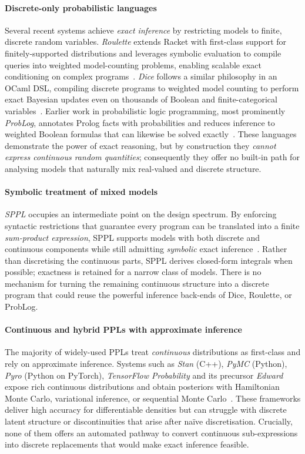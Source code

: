 \documentclass[acmsmall,screen,dvipsnames,x11names,nonacm,anonymous,review]{acmart}
\begin{document}
\paragraph{Discrete-only probabilistic languages}  
Several recent systems achieve \emph{exact inference} by restricting models to finite, discrete random variables. \emph{Roulette} extends Racket with first-class support for finitely-supported distributions and leverages symbolic evaluation to compile queries into weighted model-counting problems, enabling scalable exact conditioning on complex programs~\cite{Moy2025Roulette}. \emph{Dice} follows a similar philosophy in an OCaml DSL, compiling discrete programs to weighted model counting to perform exact Bayesian updates even on thousands of Boolean and finite-categorical variables~\cite{Holtzen2020Dice}. Earlier work in probabilistic logic programming, most prominently \emph{ProbLog}, annotates Prolog facts with probabilities and reduces inference to weighted Boolean formulas that can likewise be solved exactly~\cite{DeRaedt2007ProbLog}. These languages demonstrate the power of exact reasoning, but by construction they \emph{cannot express continuous random quantities}; consequently they offer no built-in path for analysing models that naturally mix real-valued and discrete structure.  

\paragraph{Symbolic treatment of mixed models}  
\emph{SPPL} occupies an intermediate point on the design spectrum. By enforcing syntactic restrictions that guarantee every program can be translated into a finite \emph{sum-product expression}, SPPL supports models with both discrete and continuous components while still admitting \emph{symbolic} exact inference~\cite{Saad2021SPPL}. Rather than discretising the continuous parts, SPPL derives closed-form integrals when possible; exactness is retained for a narrow class of models. There is no mechanism for turning the remaining continuous structure into a discrete program that could reuse the powerful inference back-ends of Dice, Roulette, or ProbLog.

\paragraph{Continuous and hybrid PPLs with approximate inference}  
The majority of widely-used PPLs treat \emph{continuous} distributions as first-class and rely on approximate inference. Systems such as \emph{Stan} (C++), \emph{PyMC} (Python), \emph{Pyro} (Python on PyTorch), \emph{TensorFlow Probability} and its precursor \emph{Edward} expose rich continuous distributions and obtain posteriors with Hamiltonian Monte Carlo, variational inference, or sequential Monte Carlo~\cite{Carpenter2017Stan,Salvatier2016PyMC3,Bingham2019Pyro,Dillon2017TFP,Tran2016Edward}. These frameworks deliver high accuracy for differentiable densities but can struggle with discrete latent structure or discontinuities that arise after naïve discretisation. Crucially, none of them offers an automated pathway to convert continuous sub-expressions into discrete replacements that would make exact inference feasible.
\end{document}
